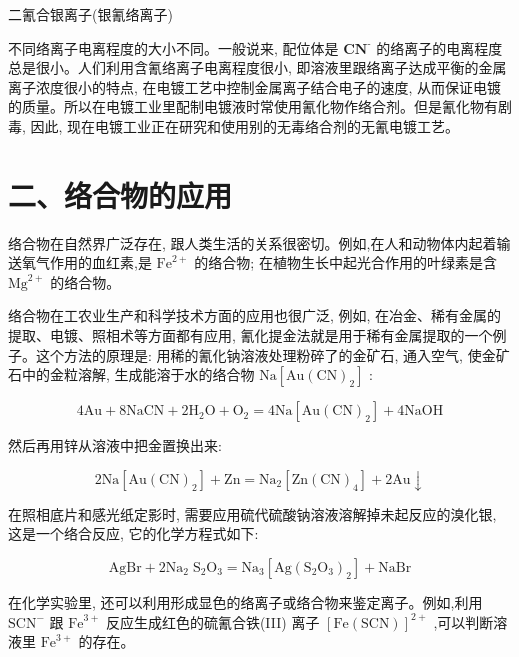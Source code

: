 \documentclass[10pt]{article}
\begin{document}
二氰合银离子(银氰络离子)

不同络离子电离程度的大小不同。一般说来, 配位体是 \({\mathbf{{CN}}}^{\text{-}}\) 的络离子的电离程度总是很小。人们利用含氰络离子电离程度很小, 即溶液里跟络离子达成平衡的金属离子浓度很小的特点, 在电镀工艺中控制金属离子结合电子的速度, 从而保证电镀的质量。所以在电镀工业里配制电镀液时常使用氰化物作络合剂。但是氰化物有剧毒, 因此, 现在电镀工业正在研究和使用别的无毒络合剂的无氰电镀工艺。

\section*{二、络合物的应用}

络合物在自然界广泛存在, 跟人类生活的关系很密切。例如,在人和动物体内起着输送氧气作用的血红素,是 \({\mathrm{{Fe}}}^{2 + }\) 的络合物; 在植物生长中起光合作用的叶绿素是含 \({\mathrm{{Mg}}}^{2 + }\) 的络合物。

络合物在工农业生产和科学技术方面的应用也很广泛, 例如, 在冶金、稀有金属的提取、电镀、照相术等方面都有应用, 氰化提金法就是用于稀有金属提取的一个例子。这个方法的原理是: 用稀的氰化钠溶液处理粉碎了的金矿石, 通入空气, 使金矿石中的金粒溶解, 生成能溶于水的络合物 \(\mathrm{{Na}}\left\lbrack {\mathrm{{Au}}{\left( \mathrm{{CN}}\right) }_{2}}\right\rbrack\) :

\[
4\mathrm{{Au}} + 8\mathrm{{NaCN}} + 2{\mathrm{H}}_{2}\mathrm{O} + {\mathrm{O}}_{2} = 4\mathrm{{Na}}\left\lbrack {\mathrm{{Au}}{\left( \mathrm{{CN}}\right) }_{2}}\right\rbrack + 4\mathrm{{NaOH}}
\]

然后再用锌从溶液中把金置换出来:

\[
2\mathrm{{Na}}\left\lbrack {\mathrm{{Au}}{\left( \mathrm{{CN}}\right) }_{2}}\right\rbrack + \mathrm{{Zn}} = {\mathrm{{Na}}}_{2}\left\lbrack {\mathrm{{Zn}}{\left( \mathrm{{CN}}\right) }_{4}}\right\rbrack + 2\mathrm{{Au}} \downarrow
\]

在照相底片和感光纸定影时, 需要应用硫代硫酸钠溶液溶解掉未起反应的溴化银, 这是一个络合反应, 它的化学方程式如下:

\[
\mathrm{{AgBr}} + 2{\mathrm{{Na}}}_{2}{\mathrm{\;S}}_{2}{\mathrm{O}}_{3} = {\mathrm{{Na}}}_{3}\left\lbrack {\mathrm{{Ag}}{\left( {\mathrm{S}}_{2}{\mathrm{O}}_{3}\right) }_{2}}\right\rbrack + \mathrm{{NaBr}}
\]

在化学实验里, 还可以利用形成显色的络离子或络合物来鉴定离子。例如,利用 \({\mathrm{{SCN}}}^{ - }\) 跟 \({\mathrm{{Fe}}}^{3 + }\) 反应生成红色的硫氰合铁(III) 离子 \({\left\lbrack \mathrm{{Fe}}\left( \mathrm{{SCN}}\right) \right\rbrack }^{2 + }\) ,可以判断溶液里 \({\mathrm{{Fe}}}^{3 + }\) 的存在。
\end{document}
